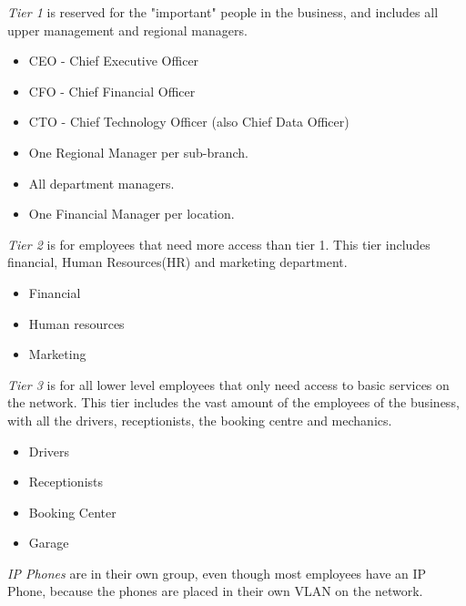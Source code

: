 \hfill

\emph{Tier 1} is reserved for the "important" people in the business, and includes all upper management and regional managers.
\begin{itemize}[noitemsep]
    \item CEO - Chief Executive Officer
    \item CFO - Chief Financial Officer
    \item CTO - Chief Technology Officer (also Chief Data Officer)
    \item One Regional Manager per sub-branch.
    \item All department managers.
    \item One Financial Manager per location.
\end{itemize}

\hfill

\emph{Tier 2} is for employees that need more access than tier 1. This tier includes financial, Human Resources(HR) and marketing department.
\begin{itemize}[noitemsep]
    \item Financial
    \item Human resources
    \item Marketing
\end{itemize}

\hfill

\emph{Tier 3} is for all lower level employees that only need access to basic services on the network. This tier includes the vast amount of the employees of the business, with all the drivers, receptionists, the booking centre and mechanics.
\begin{itemize}
    \item Drivers
    \item Receptionists
    \item Booking Center
    \item Garage
\end{itemize}

\emph{IP Phones} are in their own group, even though most employees have an IP Phone, because the phones are placed in their own VLAN on the network.

